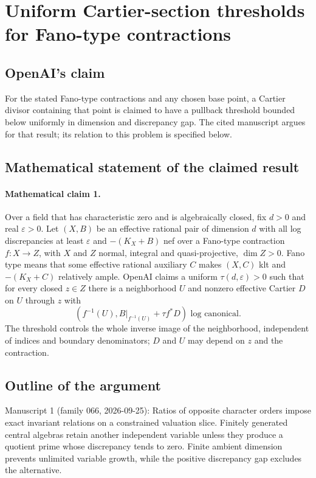 \documentclass[11pt]{article}
\begin{document}
\section*{Uniform Cartier-section thresholds for Fano-type contractions}

\subsection{OpenAI's claim}
For the stated Fano-type contractions and any chosen base point, a Cartier divisor containing that point is claimed to have a pullback threshold bounded below uniformly in dimension and discrepancy gap. The cited manuscript argues for that result; its relation to this problem is specified below.

\subsection{Mathematical statement of the claimed result}
\paragraph{Mathematical claim 1.} Over a field that has characteristic zero and is algebraically closed, fix $d>0$ and real $\varepsilon>0$. Let $(X,B)$ be an effective rational pair of dimension $d$ with all log discrepancies at least $\varepsilon$ and $-(K_X+B)$ nef over a Fano-type contraction $f:X\to Z$, with $X$ and $Z$ normal, integral and quasi-projective, $\dim Z>0$. Fano type means that some effective rational auxiliary $C$ makes $(X,C)$ klt and $-(K_X+C)$ relatively ample. OpenAI claims a uniform $\tau(d,\varepsilon)>0$ such that for every closed $z\in Z$ there is a neighborhood $U$ and nonzero effective Cartier $D$ on $U$ through $z$ with
\[
(f^{-1}(U),B|_{f^{-1}(U)}+\tau f^*D)\text{ log canonical}.
\]
The threshold controls the whole inverse image of the neighborhood, independent of indices and boundary denominators; $D$ and $U$ may depend on $z$ and the contraction.

\subsection{Outline of the argument}
Manuscript 1 (family 066, 2026-09-25): Ratios of opposite character orders impose exact invariant relations on a constrained valuation slice. Finitely generated central algebras retain another independent variable unless they produce a quotient prime whose discrepancy tends to zero. Finite ambient dimension prevents unlimited variable growth, while the positive discrepancy gap excludes the alternative.
\end{document}
